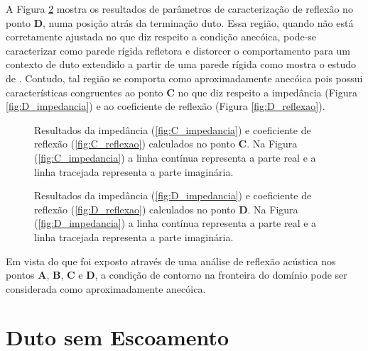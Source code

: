 A Figura \ref{fig:resultados_D} mostra os resultados de parâmetros de caracterização de reflexão no ponto \textbf{D}, numa posição atrás da terminação duto. Essa região, quando não está corretamente ajustada no que diz respeito a condição anecóica, pode-se caracterizar como parede rígida refletora e distorcer o comportamento para um contexto de duto extendido a partir de uma parede rígida como mostra o estudo de . Contudo, tal região se comporta como aproximadamente anecóica pois possui características congruentes ao ponto \textbf{C} no que diz respeito a impedância (Figura \ref{fig:D_impedancia}) e ao coeficiente de reflexão (Figura \ref{fig:D_reflexao}).

\begin{figure}
\begin{subfigure}{\scaleA \textwidth}
  
\end{subfigure}%
\begin{subfigure}{\scaleA \textwidth}
  
\end{subfigure}
\caption{Resultados da impedância (\ref{fig:C_impedancia}) e coeficiente de reflexão (\ref{fig:C_reflexao}) calculados no ponto $\textbf{C}$. Na Figura (\ref{fig:C_impedancia}) a linha contínua representa a parte real e a linha tracejada representa a parte imaginária.}
\label{fig:resultados_C}
\end{figure}

\begin{figure}
\begin{subfigure}{\scaleA \textwidth}
  
\end{subfigure}%
\begin{subfigure}{\scaleA \textwidth}
  
\end{subfigure}
\caption{Resultados da impedância (\ref{fig:D_impedancia}) e coeficiente de reflexão (\ref{fig:D_reflexao}) calculados no ponto $\textbf{D}$. Na Figura (\ref{fig:D_impedancia}) a linha contínua representa a parte real e a linha tracejada representa a parte imaginária.}
\label{fig:resultados_D}
\end{figure}

\newpage
Em vista do que foi exposto através de uma análise de reflexão acústica nos pontos \textbf{A}, \textbf{B}, \textbf{C} e \textbf{D}, a condição de contorno na fronteira do domínio pode ser considerada como aproximadamente anecóica.

\section{Duto sem Escoamento}

